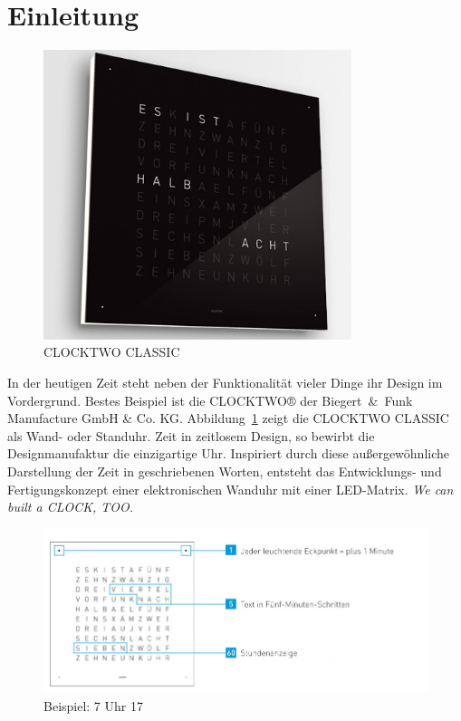 
\section{Einleitung}
\label{sec:Einleitung}

\begin{figure}[t]
    \centering
    \includegraphics[width=9cm]{Abbildungen/qlocktwo-wand}
    \caption[ClockTwo]{CLOCKTWO CLASSIC}
    \label{fig:ClockTwo}
\end{figure}
%
 \begin{multicols}{2}
 In der heutigen Zeit steht neben der Funktionalität vieler Dinge ihr Design im Vordergrund. Bestes Beispiel ist die CLOCKTWO® der Biegert~\&~Funk Manufacture GmbH \& Co. KG. Abbildung~\ref{fig:ClockTwo} zeigt die CLOCKTWO CLASSIC als Wand- oder Standuhr. %
 Zeit in zeitlosem Design, so bewirbt die Designmanufaktur die einzigartige Uhr.  Inspiriert durch diese außergewöhnliche Darstellung der Zeit in geschriebenen Worten, entsteht das Entwicklungs- und Fertigungskonzept einer elektronischen Wanduhr mit einer LED-Matrix. \textit{We can built a CLOCK, TOO.}
 \end{multicols}
 \begin{figure}[h]
    \centering
    \includegraphics[width=13cm]{Abbildungen/Uhrzeit_Beispiel}
    \caption[Uhrzeit_Bspl]{Beispiel: 7 Uhr 17}
    \label{fig:Uhrzeit_Bspl}
\end{figure}
